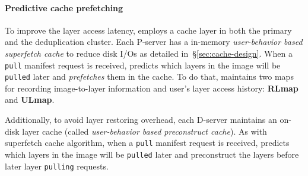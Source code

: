 \paragraph{Predictive cache prefetching}

To improve the layer access latency, \sysname employs a cache layer in both the
primary and the deduplication cluster.
%
Each P-server has a in-memory \emph{user-behavior based superfetch cache}
to reduce disk I/Os as detailed in~\S\ref{sec:cache-design}.
%
When a \texttt{pull} manifest request is received,
\sysname predicts which layers in the image will be \texttt{pulled} later
and \emph{prefetches} them in the cache.
To do that,
\sysname maintains two maps for recording image-to-layer information and user's layer access history:
\textbf{RLmap} and \textbf{ULmap}.

Additionally, to avoid layer restoring overhead,
each D-server maintains an on-disk layer cache (called \emph{user-behavior based preconstruct cache}).
As with superfetch cache algorithm,
when a \texttt{pull} manifest request is received,
\sysname predicts which layers in the image will be \texttt{pulled} later
and preconstruct the layers before later layer \texttt{pulling} requests.

%
%
  


